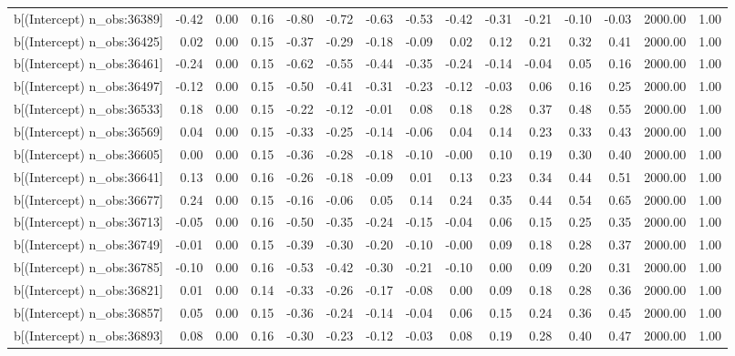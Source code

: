 \begin{table}[ht]
\begin{tabular}{rrrrrrrrrrrrrrr}
  b[(Intercept) n\_obs:36389] & -0.42 & 0.00 & 0.16 & -0.80 & -0.72 & -0.63 & -0.53 & -0.42 & -0.31 & -0.21 & -0.10 & -0.03 & 2000.00 & 1.00 \\ 
  b[(Intercept) n\_obs:36425] & 0.02 & 0.00 & 0.15 & -0.37 & -0.29 & -0.18 & -0.09 & 0.02 & 0.12 & 0.21 & 0.32 & 0.41 & 2000.00 & 1.00 \\ 
  b[(Intercept) n\_obs:36461] & -0.24 & 0.00 & 0.15 & -0.62 & -0.55 & -0.44 & -0.35 & -0.24 & -0.14 & -0.04 & 0.05 & 0.16 & 2000.00 & 1.00 \\ 
  b[(Intercept) n\_obs:36497] & -0.12 & 0.00 & 0.15 & -0.50 & -0.41 & -0.31 & -0.23 & -0.12 & -0.03 & 0.06 & 0.16 & 0.25 & 2000.00 & 1.00 \\ 
  b[(Intercept) n\_obs:36533] & 0.18 & 0.00 & 0.15 & -0.22 & -0.12 & -0.01 & 0.08 & 0.18 & 0.28 & 0.37 & 0.48 & 0.55 & 2000.00 & 1.00 \\ 
  b[(Intercept) n\_obs:36569] & 0.04 & 0.00 & 0.15 & -0.33 & -0.25 & -0.14 & -0.06 & 0.04 & 0.14 & 0.23 & 0.33 & 0.43 & 2000.00 & 1.00 \\ 
  b[(Intercept) n\_obs:36605] & 0.00 & 0.00 & 0.15 & -0.36 & -0.28 & -0.18 & -0.10 & -0.00 & 0.10 & 0.19 & 0.30 & 0.40 & 2000.00 & 1.00 \\ 
  b[(Intercept) n\_obs:36641] & 0.13 & 0.00 & 0.16 & -0.26 & -0.18 & -0.09 & 0.01 & 0.13 & 0.23 & 0.34 & 0.44 & 0.51 & 2000.00 & 1.00 \\ 
  b[(Intercept) n\_obs:36677] & 0.24 & 0.00 & 0.15 & -0.16 & -0.06 & 0.05 & 0.14 & 0.24 & 0.35 & 0.44 & 0.54 & 0.65 & 2000.00 & 1.00 \\ 
  b[(Intercept) n\_obs:36713] & -0.05 & 0.00 & 0.16 & -0.50 & -0.35 & -0.24 & -0.15 & -0.04 & 0.06 & 0.15 & 0.25 & 0.35 & 2000.00 & 1.00 \\ 
  b[(Intercept) n\_obs:36749] & -0.01 & 0.00 & 0.15 & -0.39 & -0.30 & -0.20 & -0.10 & -0.00 & 0.09 & 0.18 & 0.28 & 0.37 & 2000.00 & 1.00 \\ 
  b[(Intercept) n\_obs:36785] & -0.10 & 0.00 & 0.16 & -0.53 & -0.42 & -0.30 & -0.21 & -0.10 & 0.00 & 0.09 & 0.20 & 0.31 & 2000.00 & 1.00 \\ 
  b[(Intercept) n\_obs:36821] & 0.01 & 0.00 & 0.14 & -0.33 & -0.26 & -0.17 & -0.08 & 0.00 & 0.09 & 0.18 & 0.28 & 0.36 & 2000.00 & 1.00 \\ 
  b[(Intercept) n\_obs:36857] & 0.05 & 0.00 & 0.15 & -0.36 & -0.24 & -0.14 & -0.04 & 0.06 & 0.15 & 0.24 & 0.36 & 0.45 & 2000.00 & 1.00 \\ 
  b[(Intercept) n\_obs:36893] & 0.08 & 0.00 & 0.16 & -0.30 & -0.23 & -0.12 & -0.03 & 0.08 & 0.19 & 0.28 & 0.40 & 0.47 & 2000.00 & 1.00 \\ 

\end{tabular}
\end{table}
